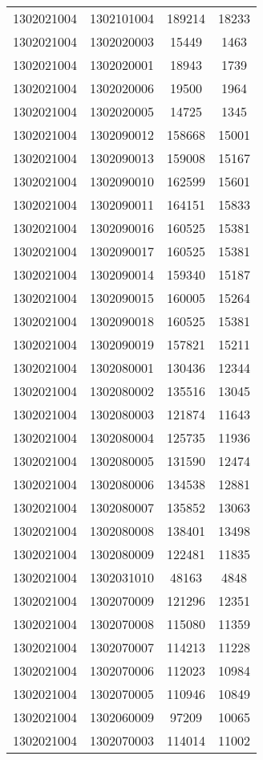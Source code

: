 \begin{longtable}{llcc}
1302021004 & 1302101004 & 189214 & 18233\\
1302021004 & 1302020003 & 15449 & 1463\\
1302021004 & 1302020001 & 18943 & 1739\\
1302021004 & 1302020006 & 19500 & 1964\\
1302021004 & 1302020005 & 14725 & 1345\\
1302021004 & 1302090012 & 158668 & 15001\\
1302021004 & 1302090013 & 159008 & 15167\\
1302021004 & 1302090010 & 162599 & 15601\\
1302021004 & 1302090011 & 164151 & 15833\\
1302021004 & 1302090016 & 160525 & 15381\\
1302021004 & 1302090017 & 160525 & 15381\\
1302021004 & 1302090014 & 159340 & 15187\\
1302021004 & 1302090015 & 160005 & 15264\\
1302021004 & 1302090018 & 160525 & 15381\\
1302021004 & 1302090019 & 157821 & 15211\\
1302021004 & 1302080001 & 130436 & 12344\\
1302021004 & 1302080002 & 135516 & 13045\\
1302021004 & 1302080003 & 121874 & 11643\\
1302021004 & 1302080004 & 125735 & 11936\\
1302021004 & 1302080005 & 131590 & 12474\\
1302021004 & 1302080006 & 134538 & 12881\\
1302021004 & 1302080007 & 135852 & 13063\\
1302021004 & 1302080008 & 138401 & 13498\\
1302021004 & 1302080009 & 122481 & 11835\\
1302021004 & 1302031010 & 48163 & 4848\\
1302021004 & 1302070009 & 121296 & 12351\\
1302021004 & 1302070008 & 115080 & 11359\\
1302021004 & 1302070007 & 114213 & 11228\\
1302021004 & 1302070006 & 112023 & 10984\\
1302021004 & 1302070005 & 110946 & 10849\\
1302021004 & 1302060009 & 97209 & 10065\\
1302021004 & 1302070003 & 114014 & 11002\\

\end{longtable}
